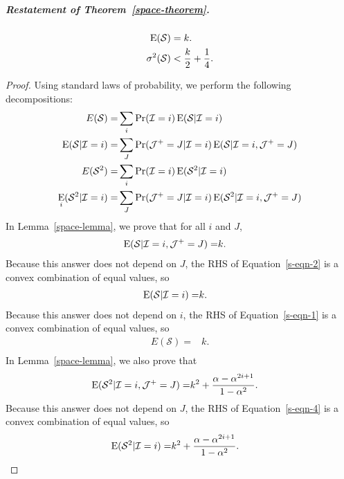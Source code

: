 \documentclass{article}
\newcommand{\ept}{\operatornamewithlimits{E}}
\begin{document}
\subparagraph*{Restatement of Theorem~\ref{space-theorem}.}
\begin{align}
\ept(\mathcal{S}) = & \; k. \\
\sigma^2(\mathcal{S}) < & \; \frac{k}{2} + \frac{1}{4}.
\end{align}



\begin{proof}
Using standard laws of probability, we perform the following decompositions:
\begin{align}
E(\mathcal{S}) =        & \sum_i \Pr (\mathcal{I}=i) \ept(\mathcal{S} | \mathcal{I}=i) \label{s-eqn-1} \\
\ept(\mathcal{S}| \mathcal{I}=i) = & \sum_{J} \Pr (\mathcal{J}^+=J | \mathcal{I}=i) \ept(\mathcal{S} | \mathcal{I}=i, \mathcal{J}^+ = J) \label{s-eqn-2} \\
E(\mathcal{S}^2) =      & \sum_i \Pr (\mathcal{I}=i) \ept (\mathcal{S}^2 | \mathcal{I}=i) \label {s-eqn-3} \\
\ept_i(\mathcal{S}^2|\mathcal{I}=i) = & \sum_{J} \Pr (\mathcal{J}^+=J | \mathcal{I}=i) \ept (\mathcal{S}^2 | \mathcal{I}=i, \mathcal{J}^+ = J) \label{s-eqn-4}
\end{align}
In Lemma~\ref{space-lemma}, we prove that for all $i$ and $J$,
\begin{align}
\ept(\mathcal{S} | \mathcal{I}=i, \mathcal{J}^+ = J) = & k.
\end{align}
Because this answer does not depend on $J$, the RHS of 
Equation~\eqref{s-eqn-2} is a convex combination of equal values, so
\begin{align*}
\ept(\mathcal{S}|\mathcal{I}=i) = & k.
\end{align*}
Because this answer does not depend on $i$, the RHS of 
Equation~\eqref{s-eqn-1} is a convex combination of equal values, so
\begin{align*}
E(\mathcal{S}) = & k. \\
\end{align*}
In Lemma~\ref{space-lemma}, we also prove that
\begin{align*}
\ept(\mathcal{S}^2 | \mathcal{I}=i, \mathcal{J}^+=J) = & k^2 + \frac{\alpha - \alpha^{2i+1}}{1-\alpha^2}.
\end{align*}
Because this answer does not depend on $J$, the RHS of 
Equation~\eqref{s-eqn-4} is a convex combination of equal values, so
\begin{align}
\ept(\mathcal{S}^2|\mathcal{I}=i) = & k^2 + \frac{\alpha - \alpha^{2i+1}}{1-\alpha^2}. \label{s-eqn-5}

\end{align}
\end{proof}
\end{document}
